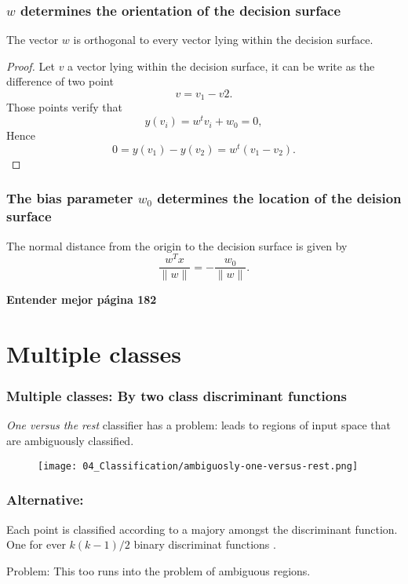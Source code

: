 \begin{frame}
    \frametitle{$w$ determines the orientation of the decision surface}

    \begin{theorem}
        The vector $w$ is orthogonal to every vector lying within the decision surface. 
    \end{theorem}
    {\small
    \begin{proof}
        Let $v$ a vector lying within the decision surface, it can be write as the difference of two point 
        \begin{equation}
            v = v_1 - v2. 
        \end{equation}
        Those points verify that
        \begin{equation}
            y(v_i) = w ^t v_i + w_0 = 0, 
        \end{equation}
        Hence 
        \begin{equation}
            0 = y(v_1) - y(v_2) = w ^t (v_1 - v_2).
        \end{equation}
    \end{proof}
    }
\end{frame}

\begin{frame}
    \frametitle{The bias parameter $w_0$ determines the location of the deision surface}
    \begin{theorem}
        The normal distance from the origin to the decision surface is given by
        \begin{equation}
          \frac{w ^T x}{\|w\|} = - \frac{w_0}{\|w\|}.  
        \end{equation}
    \end{theorem}
    \textbf{Entender mejor página 182}
\end{frame}

\section{Multiple classes}
\begin{frame}
    \frametitle{Multiple classes: By two class discriminant functions}

    \textit{One versus the rest} classifier has a problem: 
    leads to regions of input space that are ambiguously classified. 

    \begin{figure}[t]
        \texttt{[image: 04\_Classification/ambiguosly-one-versus-rest.png]}
        \centering
    \end{figure}
\end{frame}
\begin{frame}
    \frametitle{Alternative:  }
    Each  point is classified according to a majory amongst the discriminant function. 
One for ever $k (k-1) / 2$ binary discriminat functions . 

Problem: This too runs into the problem of ambiguous regions. 
\end{frame}

